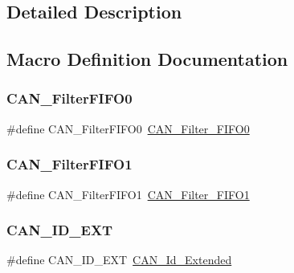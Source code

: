 \subsection{Detailed Description}


\subsection{Macro Definition Documentation}
\mbox{\label{group___c_a_n___legacy_ga1b3d041dff9fed4dad75ed2a4a0e27e0}} 
\subsubsection{\texorpdfstring{CAN\_FilterFIFO0}{CAN\_FilterFIFO0}}
{\footnotesize\ttfamily \#define C\+A\+N\+\_\+\+Filter\+F\+I\+F\+O0~\mbox{\hyperlink{group___c_a_n__filter___f_i_f_o_ga8249c27978ca94676530540b88a6be8f}{C\+A\+N\+\_\+\+Filter\+\_\+\+F\+I\+F\+O0}}}

\mbox{\label{group___c_a_n___legacy_gada8f9b3a9c88f36539aaeb457039e666}} 
\subsubsection{\texorpdfstring{CAN\_FilterFIFO1}{CAN\_FilterFIFO1}}
{\footnotesize\ttfamily \#define C\+A\+N\+\_\+\+Filter\+F\+I\+F\+O1~\mbox{\hyperlink{group___c_a_n__filter___f_i_f_o_gaab8478c89a607c4b8baf68efc730e316}{C\+A\+N\+\_\+\+Filter\+\_\+\+F\+I\+F\+O1}}}

\mbox{\label{group___c_a_n___legacy_ga5f6fdd1dc3d312af1ac30e2eee15d6f0}} 
\subsubsection{\texorpdfstring{CAN\_ID\_EXT}{CAN\_ID\_EXT}}
{\footnotesize\ttfamily \#define C\+A\+N\+\_\+\+I\+D\+\_\+\+E\+XT~\mbox{\hyperlink{group___c_a_n__identifier__type_gaf6c5c0b43b968fed17fd90246912b1a7}{C\+A\+N\+\_\+\+Id\+\_\+\+Extended}}}

